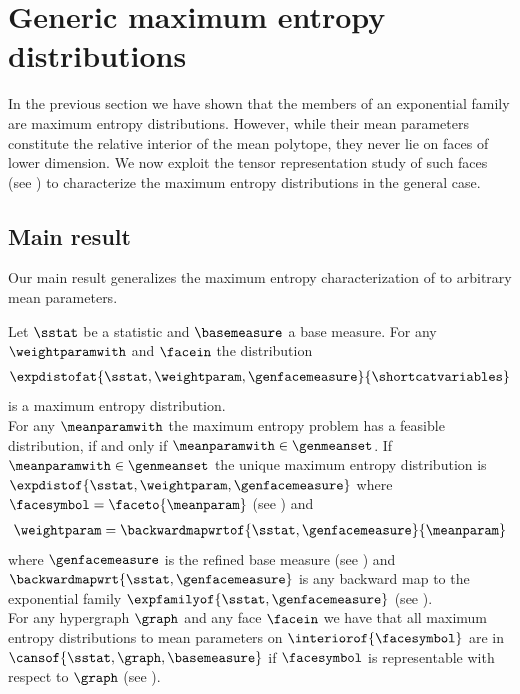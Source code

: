\section{Generic maximum entropy distributions}\label{sec:genMaxEnt}

In the previous section we have shown that the members of an exponential family are maximum entropy distributions.
However, while their mean parameters constitute the relative interior of the mean polytope, they never lie on faces of lower dimension.
We now exploit the tensor representation study of such faces (see ) to characterize the maximum entropy distributions in the general case.

\subsection{Main result}

Our main result generalizes the maximum entropy characterization of  to arbitrary mean parameters.

\begin{theorem}
    \label{the:MAINgenMaxEntChar}
    Let $\sstat$ be a statistic and $\basemeasure$ a base measure.
    For any $\weightparamwith$ and $\facein$ the distribution
    \begin{align*}
        \expdistofat{\sstat,\weightparam,\genfacemeasure}{\shortcatvariables}
    \end{align*}
    is a maximum entropy distribution. \\
    For any $\meanparamwith$ the maximum entropy problem has a feasible distribution, if and only if $\meanparamwith\in\genmeanset$.
    If $\meanparamwith\in\genmeanset$ the unique maximum entropy distribution is $\expdistof{\sstat,\weightparam,\genfacemeasure}$ where $\facesymbol=\faceto{\meanparam}$ (see ) and
    \begin{align*}
        \weightparam
        = \backwardmapwrtof{\sstat,\genfacemeasure}{\meanparam}
    \end{align*}
    where $\genfacemeasure$ is the refined base measure (see ) and $\backwardmapwrt{\sstat,\genfacemeasure}$ is any backward map to the exponential family $\expfamilyof{\sstat,\genfacemeasure}$ (see ). \\
    For any hypergraph $\graph$ and any face $\facein$ we have that all maximum entropy distributions to mean parameters on $\interiorof{\facesymbol}$ are in $\cansof{\sstat,\graph,\basemeasure}$ if $\facesymbol$ is representable with respect to $\graph$ (see ).
\end{theorem}

